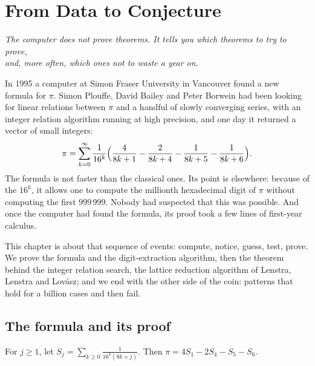 \chapter{From Data to Conjecture}
\label{ch:experiments}

\begin{center}\itshape
The computer does not prove theorems. It tells you which theorems to try to prove,\\
and, more often, which ones not to waste a year on.
\end{center}

In 1995 a computer at Simon Fraser University in Vancouver found a new formula for $\pi$. Simon Plouffe, David Bailey and Peter Borwein had been
looking for linear relations between $\pi$ and a handful of slowly converging series, with an integer relation algorithm running at high
precision, and one day it returned a vector of small integers:
\[
\pi=\sum_{k=0}^\infty\frac1{16^k}\Bigl(\frac4{8k+1}-\frac2{8k+4}-\frac1{8k+5}-\frac1{8k+6}\Bigr).
\]
The formula is not faster than the classical ones. Its point is elsewhere: because of the $16^k$, it allows one to compute the millionth
hexadecimal digit of $\pi$ without computing the first $999\,999$. Nobody had suspected that this was possible. And once the computer had
found the formula, its proof took a few lines of first-year calculus.

This chapter is about that sequence of events: compute, notice, guess, test, prove. We prove the formula and the digit-extraction algorithm,
then the theorem behind the integer relation search, the lattice reduction algorithm of Lenstra, Lenstra and Lov\'asz; and we end with the
other side of the coin: patterns that hold for a billion cases and then fail.

\section{The formula and its proof}

\begin{theorem}\label{thm:bbp}
For $j\ge1$, let $S_j=\sum_{k\ge0}\frac1{16^k(8k+j)}$. Then $\pi=4S_1-2S_4-S_5-S_6$.
\end{theorem}


